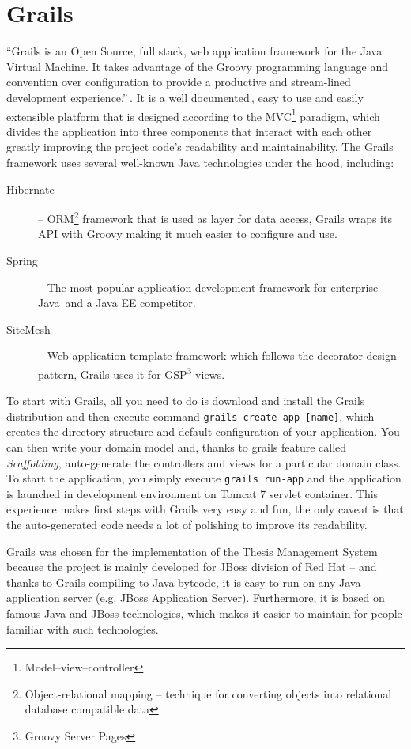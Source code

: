 \section{Grails}

``Grails is an Open Source, full stack, web application framework for the Java Virtual Machine. It takes advantage of the Groovy programming language and convention over configuration to provide a productive and stream-lined development experience.''\,\cite{grails-homepage}. It is a well documented\,\cite{grails-documentation}, easy to use and easily extensible platform that is designed according to the MVC\footnote{Model--view--controller} paradigm, which divides the application into three components that interact with each other greatly improving the project code's readability and maintainability. The Grails framework uses several well-known Java technologies under the hood, including:

\begin{description}
    \item[Hibernate] -- ORM\footnote{Object-relational mapping -- technique for converting objects into relational database compatible data} framework that is used as layer for data access, Grails wraps its API with Groovy making it much easier to configure and use.
    \item[Spring] -- The most popular application development framework for enterprise Java\,\cite{springsource-homepage} and a Java EE competitor.
    \item[SiteMesh] -- Web application template framework which follows the decorator design pattern, Grails uses it for GSP\footnote{Groovy Server Pages} views.
\end{description}

To start with Grails, all you need to do is download and install the Grails distribution and then execute command \texttt{grails create-app [name]}, which creates the directory structure and default configuration of your application. You can then write your domain model and, thanks to grails feature called \emph{Scaffolding}, auto-generate the controllers and views for a particular domain class. To start the application, you simply execute \texttt{grails run-app} and the application is launched in development environment on Tomcat 7 servlet container. This experience makes first steps with Grails very easy and fun, the only caveat is that the auto-generated code needs a lot of polishing to improve its readability.

Grails was chosen for the implementation of the Thesis Management System because the project is mainly developed for JBoss division of Red Hat -- and thanks to Grails compiling to Java bytcode, it is easy to run on any Java application server (e.g. JBoss Application Server). Furthermore, it is based on famous Java and JBoss technologies, which makes it easier to maintain for people familiar with such technologies. 

